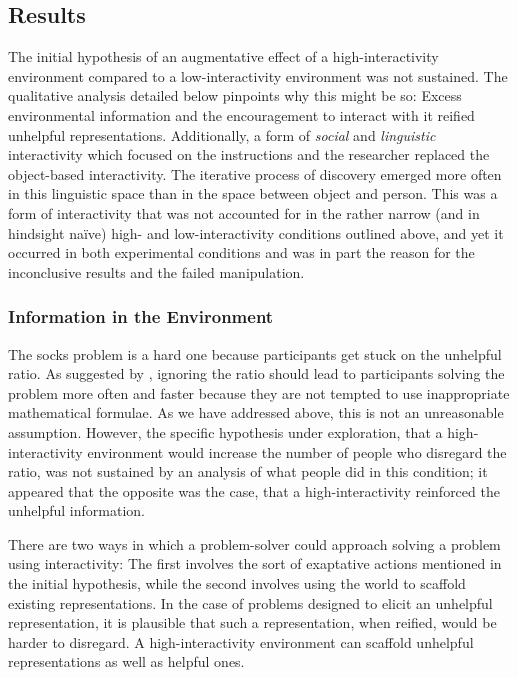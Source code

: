 \documentclass[twocolumn, serif, empirical, authordate]{jote-article}
\begin{document}
{{
\subsection{Results}

The initial hypothesis of an augmentative effect of a high-interactivity environment compared to a low-interactivity environment was not sustained. The qualitative analysis detailed below pinpoints why this might be so: Excess environmental information and the encouragement to interact with it reified unhelpful representations. Additionally, a form of \emph{social} and \emph{linguistic} interactivity which focused on the instructions and the researcher replaced the object-based interactivity. The iterative process of discovery emerged more often in this linguistic space than in the space between object and person. This was a form of interactivity that was not accounted for in the rather narrow (and in hindsight naïve) high- and low-interactivity conditions outlined above, and yet it occurred in both experimental conditions and was in part the reason for the inconclusive results and the failed manipulation.


\subsubsection{Information in the Environment}

The socks problem is a hard one because participants get stuck on the unhelpful ratio. As suggested by \textcite{Vallée-Tourangeau2020}, ignoring the ratio should lead to participants solving the problem more often and faster because they are not tempted to use inappropriate mathematical formulae. As we have addressed above, this is not an unreasonable assumption. However, the specific hypothesis under exploration, that a high-interactivity environment would increase the number of people who disregard the ratio, was not sustained by an analysis of what people did in this condition; it appeared that the opposite was the case, that a high-interactivity reinforced the unhelpful information.

There are two ways in which a problem-solver could approach solving a problem using interactivity: The first involves the sort of exaptative actions mentioned in the initial hypothesis, while the second involves using the world to scaffold existing representations. In the case of problems designed to elicit an unhelpful representation, it is plausible that such a representation, when reified, would be harder to disregard.
A high-interactivity environment can scaffold unhelpful representations as well as helpful ones.

}}
\end{document}
